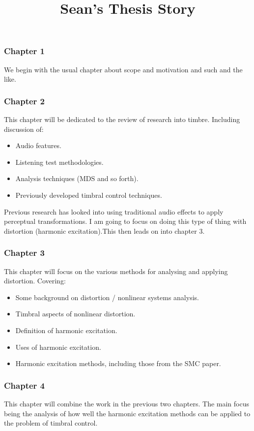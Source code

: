 \documentclass[a4paper]{article}
\title{Sean's Thesis Story}
\author{}
\date{}
\begin{document}
\maketitle
	
	\subsubsection*{Chapter 1}
	We begin with the usual chapter about scope and motivation and such and the like.

	\subsubsection*{Chapter 2}
	This chapter will be dedicated to the review of research into timbre. Including discussion of:

		\begin{itemize}
			\item Audio features.
			\item Listening test methodologies.
			\item Analysis techniques (MDS and so forth).
			\item Previously developed timbral control techniques.
		\end{itemize}

		Previous research has looked into using traditional audio effects to apply perceptual transformations. I am
		going to focus on doing this type of thing with distortion (harmonic excitation).This then leads on into
		chapter 3.

	\subsubsection*{Chapter 3}
	This chapter will focus on the various methods for analysing and applying distortion. Covering:

		\begin{itemize}
			\item Some background on distortion / nonlinear systems analysis.
			\item Timbral aspects of nonlinear distortion.
			\item Definition of harmonic excitation.
			\item Uses of harmonic excitation.
			\item Harmonic excitation methods, including those from the SMC paper.
		\end{itemize}

	\subsubsection*{Chapter 4}
	This chapter will combine the work in the previous two chapters. The main focus being the analysis of how well the
	harmonic excitation methods can be applied to the problem of timbral control. 
	
\end{document}

